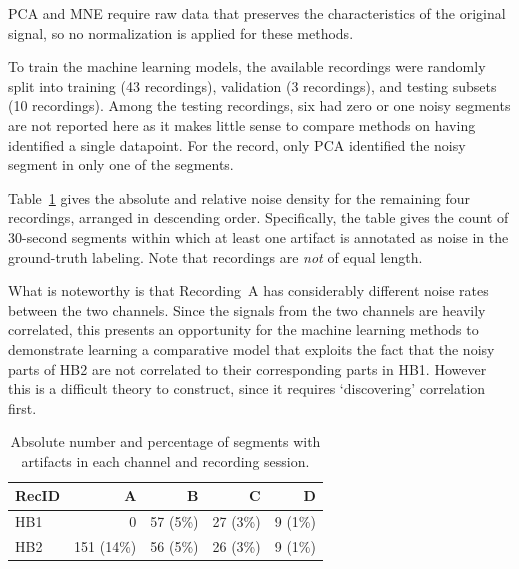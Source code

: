 \documentclass[runningheads]{llncs}
\begin{document}


PCA and MNE require raw data that preserves the characteristics of the
original signal, so no normalization is applied for these methods.

To train the machine learning models, the available recordings were
randomly split into training (43 recordings), validation (3
recordings), and testing subsets (10 recordings). Among the testing
recordings, six had zero or one noisy segments are not reported here
as it makes little sense to compare methods on having identified a
single datapoint. For the record, only PCA identified the noisy
segment in only one of the segments.

Table~\ref{tab2} gives the absolute and relative noise density for the
remaining four recordings, arranged in descending order.
Specifically, the table gives the count of 30-second segments within
which at least one artifact is annotated as noise in the ground-truth
labeling. Note that recordings are \emph{not} of equal length.

What is noteworthy is that Recording~A has considerably different
noise rates between the two channels. Since the signals from the
two channels are heavily correlated, this presents an opportunity
for the machine learning methods to demonstrate learning a
comparative model that exploits the fact that the noisy parts of
HB2 are not correlated to their corresponding parts in HB1. However
this is a difficult theory to construct, since it requires
`discovering' correlation first.


\begin{table}[bt]
\caption{Absolute number and percentage of segments with artifacts in
  each channel and recording session.}
\centering
\renewcommand{\arraystretch}{1.3} %
\begin{tabular}{lrrrr}
\toprule
RecID &  A         &  B       &  C & D \\
\midrule
HB1   &   0        & 57 (5\%) & 27 (3\%) & 9 (1\%) \\

HB2   & 151 (14\%) & 56 (5\%) & 26 (3\%) & 9 (1\%) \\
\bottomrule
\end{tabular}
\label{tab2}
\end{table}
\end{document}
